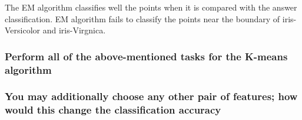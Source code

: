 \documentclass[a4paper]{article}
\begin{document}
\begin{itemize}
	The EM algorithm classifies well the points when it is compared with the answer classification. EM algorithm fails to classify the points near the boundary of iris-Versicolor and iris-Virgnica.
	\end{itemize}

	\subsubsection{Perform all of the above-mentioned tasks for the K-means algorithm}
	\clearpage
	\subsubsection{You may additionally choose any other pair of features; how would this change the classiﬁcation accuracy}
	
\end{document}
